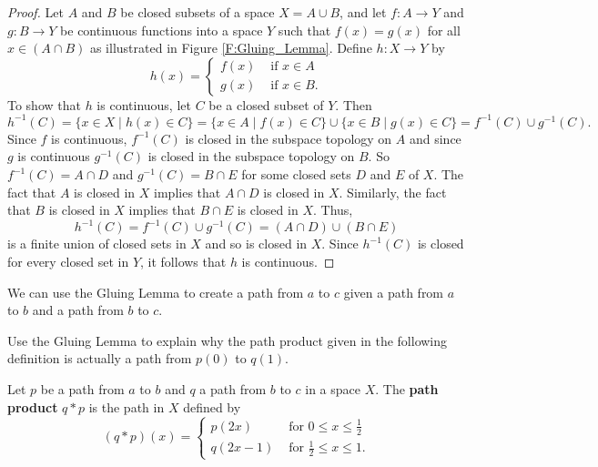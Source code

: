 \begin{proof} Let $A$ and $B$ be closed subsets of a space $X = A \cup B$, and let $f:A \to Y$ and $g: B \to Y$ be continuous functions into a space $Y$ such that $f(x)=g(x)$ for all $x \in (A \cap B)$ as illustrated in Figure \ref{F:Gluing_Lemma}. Define $h: X \to Y$ by
\[h(x) = \begin{cases} f(x) &\text{ if } x \in A \\ g(x) &\text{ if } x \in B. \end{cases}\] 
To show that $h$ is continuous, let $C$ be a closed subset of $Y$. Then 
\[h^{-1}(C) = \{x \in X \mid h(x) \in C\} = \{x \in A \mid f(x) \in C\} \cup \{x \in B \mid g(x) \in C\} = f^{-1}(C) \cup g^{-1}(C).\]
Since $f$ is continuous, $f^{-1}(C)$ is closed in the subspace topology on $A$ and since $g$ is continuous $g^{-1}(C)$ is closed in the subspace topology on $B$. So $f^{-1}(C) = A \cap D$ and $g^{-1}(C) = B \cap E$ for some closed sets $D$ and $E$ of $X$. The fact that $A$ is closed in $X$ implies that $A \cap D$ is closed in $X$. Similarly, the fact that $B$ is closed in $X$ implies that $B \cap E$ is closed in $X$. Thus,
\[h^{-1}(C) = f^{-1}(C) \cup g^{-1}(C) = (A \cap D) \cup (B \cap E)\]
is a  finite union of closed sets in $X$ and so is closed in $X$. Since $h^{-1}(C)$ is closed for every closed set in $Y$, it follows that $h$ is continuous.
\end{proof}

We can use the Gluing Lemma to create a path from $a$ to $c$ given a path from $a$ to $b$ and a path from $b$ to $c$.

\begin{activity} Use the Gluing Lemma to explain why the path product given in the following definition is actually a path from $p(0)$ to $q(1)$. 

\begin{definition} Let $p$ be a path from $a$ to $b$ and $q$ a path from $b$ to $c$ in a space $X$. The \textbf{path product} $q*p$ is the path in $X$ defined by 
\[(q*p)(x) = \begin{cases} p(2x) &\text{ for } 0 \leq x \leq \frac{1}{2} \\ q(2x-1) &\text{ for } \frac{1}{2} \leq x \leq 1. \end{cases}\]
\end{definition}

\end{activity}

\begin{comment}

\ActivitySolution The Gluing Lemma allows us to piece together the paths $p$ and $q$. Let $A = \left[0 \frac{1}{2}\right]$, $B = \left[\frac{1}{2}, 1\right]$, $f(x) = p(2x)$, and $g(x) = q(2x-1)$. Then $A \cap B = \left\{\frac{1}{2} \right\}$. Note that $f\left(\frac{1}{2}\right) = p(1) = b = q(0) = g\left(\frac{1}{2}\right)$. It follows that $h$ as in the Gluing Lemma is a path from $a$ to $c$. 

\end{comment}

